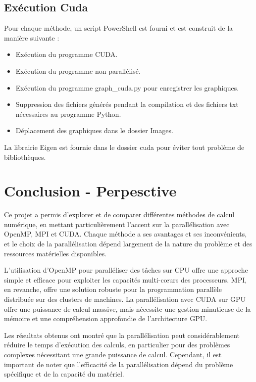 \documentclass[10pt,a4paper]{article}
\begin{document}
\subsection{Exécution Cuda}
Pour chaque méthode, un script PowerShell est fourni et est construit de la manière suivante :
\begin{itemize}
\item Exécution du programme CUDA.
\item Exécution du programme non parallélisé.
\item Exécution du programme graph\_cuda.py pour enregistrer les graphiques.
\item Suppression des fichiers générés pendant la compilation et des fichiers txt nécessaires au programme Python.
\item Déplacement des graphiques dans le dossier Images.

\end{itemize}

La librairie Eigen est fournie dans le dossier cuda pour éviter tout problème de bibliothèques.

\newpage
\section{Conclusion - Perpesctive}
Ce projet a permis d'explorer et de comparer différentes méthodes de calcul numérique, en mettant particulièrement l'accent sur la parallélisation avec OpenMP, MPI et CUDA. Chaque méthode a ses avantages et ses inconvénients, et le choix de la parallélisation dépend largement de la nature du problème et des ressources matérielles disponibles.

L'utilisation d'OpenMP pour paralléliser des tâches sur CPU offre une approche simple et efficace pour exploiter les capacités multi-cœurs des processeurs. MPI, en revanche, offre une solution robuste pour la programmation parallèle distribuée sur des clusters de machines. La parallélisation avec CUDA sur GPU offre une puissance de calcul massive, mais nécessite une gestion minutieuse de la mémoire et une compréhension approfondie de l'architecture GPU.

Les résultats obtenus ont montré que la parallélisation peut considérablement réduire le temps d'exécution des calculs, en particulier pour des problèmes complexes nécessitant une grande puissance de calcul. Cependant, il est important de noter que l'efficacité de la parallélisation dépend du problème spécifique et de la capacité du matériel.
\end{document}
